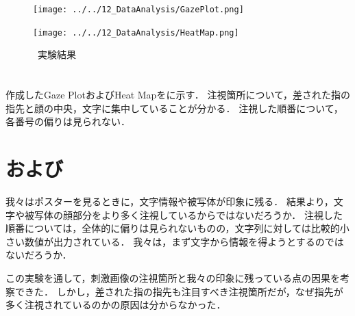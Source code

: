\begin{figure}
    \vspace{-1cm}
    \centering
    \begin{minipage}[b]{.2\textwidth}
        \centering
        \texttt{[image: ../../12\_DataAnalysis/GazePlot.png]}
    \end{minipage}
    \begin{minipage}[b]{.2\textwidth}
        \centering
        \texttt{[image: ../../12\_DataAnalysis/HeatMap.png]}
    \end{minipage}
    \caption{\kadaid \ 実験結果}
    \label{fig:実験結果\kadaid}
    \vspace{-1.5cm}
\end{figure}
\section{\result}
作成したGaze PlotおよびHeat Mapをに示す．
注視箇所について，差された指の指先と顔の中央，文字に集中していることが分かる．
注視した順番について，各番号の偏りは見られない．
\section{\consideration および\conclusion}
我々はポスターを見るときに，文字情報や被写体が印象に残る．
結果より，文字や被写体の顔部分をより多く注視しているからではないだろうか．
注視した順番については，全体的に偏りは見られないものの，文字列に対しては比較的小さい数値が出力されている．
我々は，まず文字から情報を得ようとするのではないだろうか．\par
この実験を通して，刺激画像の注視箇所と我々の印象に残っている点の因果を考察できた．
しかし，差された指の指先も注目すべき注視箇所だが，なぜ指先が多く注視されているのかの原因は分からなかった．